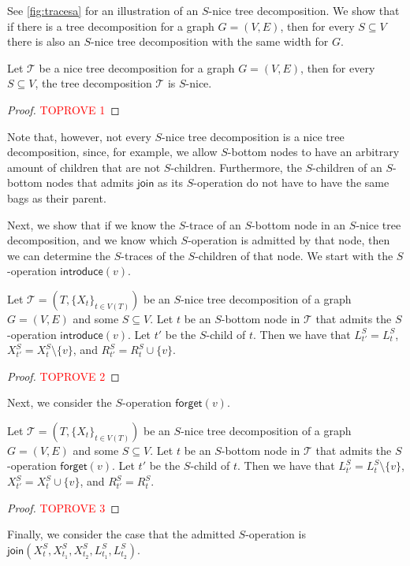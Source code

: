 \documentclass[a4paper,UKenglish,cleveref, autoref, thm-restate, numberwithinsect]{lipics-v2021}
\newcommand{\introduce}{\mathsf{introduce}}
\newcommand{\forget}{\mathsf{forget}}
\newcommand{\join}{\mathsf{join}}
\begin{document}
See \cref{fig:tracesa} for an illustration of an $S$-nice tree decomposition. We show that if there is a tree decomposition for a graph $G=(V,E)$, then for every $S\subseteq V$ there is also an $S$-nice tree decomposition with the same width for $G$.

\begin{lemma}\label{lem:snicetd}
    Let $\mathcal{T}$ be a nice tree decomposition for a graph $G=(V,E)$, then for every $S\subseteq V$, the tree decomposition $\mathcal{T}$ is $S$-nice.
\end{lemma}
\begin{proof}\textcolor{red}{TOPROVE 1}\end{proof}

Note that, however, not every $S$-nice tree decomposition is a nice tree decomposition, since, for example, we allow $S$-bottom nodes to have an arbitrary amount of children that are not $S$-children. Furthermore, the $S$-children of an $S$-bottom nodes that admits $\join$ as its $S$-operation do not have to have the same bags as their parent.

Next, we show that if we know the $S$-trace of an $S$-bottom node in an $S$-nice tree decomposition, and we know which $S$-operation is admitted by that node, then we can determine the $S$-traces of the $S$-children of that node. We start with the $S$-operation $\introduce(v)$.

\begin{observation}\label{obs:introduce}
    Let $\mathcal{T}=(T,\{X_t\}_{t\in V(T)})$ be an $S$-nice tree decomposition of a graph $G=(V,E)$ and some $S\subseteq V$. Let $t$ be an $S$-bottom node in $\mathcal{T}$ that admits the $S$-operation $\introduce(v)$. Let $t'$ be the $S$-child of $t$.
    Then we have that $L_{t'}^S= L_{t}^S$, $X_{t'}^S= X_{t}^S\setminus \{v\}$, and $R_{t'}^S=R_{t}^S\cup \{v\}$.
\end{observation}
\begin{proof}\textcolor{red}{TOPROVE 2}\end{proof}
Next, we consider the $S$-operation $\forget(v)$.

\begin{observation}\label{obs:forget}
    Let $\mathcal{T}=(T,\{X_t\}_{t\in V(T)})$ be an $S$-nice tree decomposition of a graph $G=(V,E)$ and some $S\subseteq V$. Let $t$ be an $S$-bottom node in $\mathcal{T}$ that admits the $S$-operation $\forget(v)$. Let $t'$ be the $S$-child of $t$.
    Then we have that $L_{t'}^S= L_{t}^S\setminus \{v\}$, $X_{t'}^S= X_{t}^S\cup \{v\}$, and $R_{t'}^S=R_{t}^S$. 
\end{observation}
\begin{proof}\textcolor{red}{TOPROVE 3}\end{proof}
Finally, we consider the case that the admitted $S$-operation is $\join(X^S_t,X_{t_1}^S, X_{t_2}^S,L_{t_1}^S, L_{t_2}^S)$. 
\end{document}

